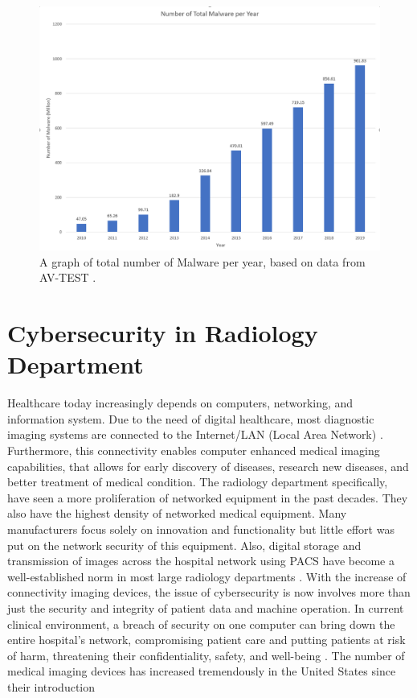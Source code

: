 \documentclass[pdf,bookmarks,colorlinks=true]{IEEEtran}
\begin{document}
\begin{figure}
	\centering
	\includegraphics[width=0.7\linewidth]{"Total Number Of Malware per Year"}
	\caption{A graph of total number of Malware per year, based on data from AV-TEST \cite{AVtest}.}
	\label{fig:total-number-of-malware-per-year}
\end{figure}


\section{Cybersecurity in Radiology Department}
\label{sec:Radiology}
Healthcare today increasingly depends on computers, networking, and information system. Due to the need of digital healthcare, most diagnostic imaging systems are connected to the Internet/LAN (Local Area Network) \cite{ma2019medical}. Furthermore, this connectivity enables computer enhanced medical imaging capabilities, that allows for early discovery of diseases, research new diseases, and better treatment of medical condition.  The radiology department specifically, have seen a more proliferation of networked equipment in the past decades. They also have the highest density of networked medical equipment. Many manufacturers focus solely on innovation and functionality but little effort was put on the network security of this equipment. Also, digital storage and transmission of images across the hospital network using PACS have become a well-established norm in most large radiology departments \cite{moses2015lack}. With the increase of connectivity imaging devices, the issue of cybersecurity is now involves more than just the security and integrity of patient data and machine operation. In current clinical environment, a breach of security on one computer can bring down the entire hospital's network, compromising patient care and putting patients at risk of harm, threatening their confidentiality, safety, and well-being \cite{ferrara2019cybersecurity}. The number of medical imaging devices has increased tremendously in the United States since their introduction 
\end{document}
